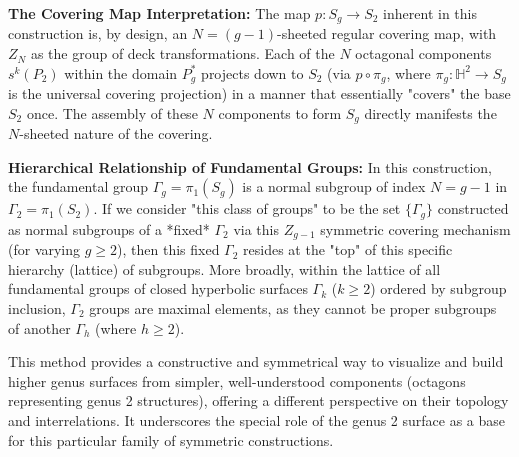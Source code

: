 \documentclass{article}
\theoremstyle{definition}
\theoremstyle{remark}
\begin{document}
\textbf{The Covering Map Interpretation:}
The map $p: S_g \to S_2$ inherent in this construction is, by design, an $N=(g-1)$-sheeted regular covering map, with $Z_N$ as the group of deck transformations. Each of the $N$ octagonal components $s^k(P_2)$ within the domain $P_g^*$ projects down to $S_2$ (via $p \circ \pi_g$, where $\pi_g: \mathbb{H}^2 \to S_g$ is the universal covering projection) in a manner that essentially "covers" the base $S_2$ once. The assembly of these $N$ components to form $S_g$ directly manifests the $N$-sheeted nature of the covering.

\textbf{Hierarchical Relationship of Fundamental Groups:}
In this construction, the fundamental group $\Gamma_g = \pi_1(S_g)$ is a normal subgroup of index $N=g-1$ in $\Gamma_2 = \pi_1(S_2)$. If we consider "this class of groups" to be the set $\{\Gamma_g\}$ constructed as normal subgroups of a *fixed* $\Gamma_2$ via this $Z_{g-1}$ symmetric covering mechanism (for varying $g \ge 2$), then this fixed $\Gamma_2$ resides at the "top" of this specific hierarchy (lattice) of subgroups. More broadly, within the lattice of all fundamental groups of closed hyperbolic surfaces $\Gamma_k$ ($k \ge 2$) ordered by subgroup inclusion, $\Gamma_2$ groups are maximal elements, as they cannot be proper subgroups of another $\Gamma_h$ (where $h \ge 2$).

This method provides a constructive and symmetrical way to visualize and build higher genus surfaces from simpler, well-understood components (octagons representing genus 2 structures), offering a different perspective on their topology and interrelations. It underscores the special role of the genus 2 surface as a base for this particular family of symmetric constructions.
\end{document}
